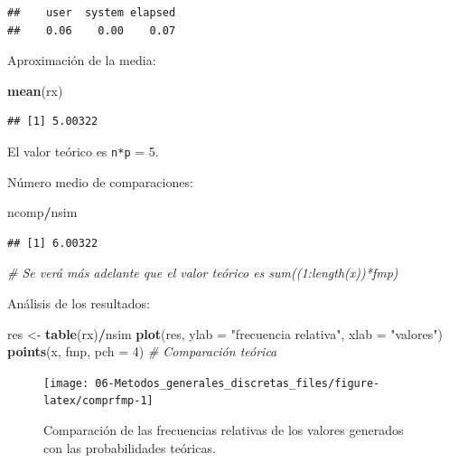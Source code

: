 \documentclass[
]{book}
\newenvironment{Shaded}{\begin{snugshade}}{\end{snugshade}}
\newcommand{\CommentTok}[1]{\textcolor[rgb]{0.56,0.35,0.01}{\textit{#1}}}
\newcommand{\DataTypeTok}[1]{\textcolor[rgb]{0.13,0.29,0.53}{#1}}
\newcommand{\DecValTok}[1]{\textcolor[rgb]{0.00,0.00,0.81}{#1}}
\newcommand{\KeywordTok}[1]{\textcolor[rgb]{0.13,0.29,0.53}{\textbf{#1}}}
\newcommand{\NormalTok}[1]{#1}
\newcommand{\OperatorTok}[1]{\textcolor[rgb]{0.81,0.36,0.00}{\textbf{#1}}}
\newcommand{\StringTok}[1]{\textcolor[rgb]{0.31,0.60,0.02}{#1}}
\theoremstyle{break}
\theoremstyle{definition}
\theoremstyle{definition}
\theoremstyle{definition}
\theoremstyle{remark}
\begin{document}
\begin{verbatim}
##    user  system elapsed 
##    0.06    0.00    0.07
\end{verbatim}

Aproximación de la media:

\begin{Shaded}
\begin{Highlighting}[]
\KeywordTok{mean}\NormalTok{(rx)}
\end{Highlighting}
\end{Shaded}

\begin{verbatim}
## [1] 5.00322
\end{verbatim}

El valor teórico es \texttt{n*p} = 5.

Número medio de comparaciones:

\begin{Shaded}
\begin{Highlighting}[]
\NormalTok{ncomp}\OperatorTok{/}\NormalTok{nsim}
\end{Highlighting}
\end{Shaded}

\begin{verbatim}
## [1] 6.00322
\end{verbatim}

\begin{Shaded}
\begin{Highlighting}[]
\CommentTok{# Se verá más adelante que el valor teórico es sum((1:length(x))*fmp)}
\end{Highlighting}
\end{Shaded}

Análisis de los resultados:

\begin{Shaded}
\begin{Highlighting}[]
\NormalTok{res <-}\StringTok{ }\KeywordTok{table}\NormalTok{(rx)}\OperatorTok{/}\NormalTok{nsim}
\KeywordTok{plot}\NormalTok{(res, }\DataTypeTok{ylab =} \StringTok{"frecuencia relativa"}\NormalTok{, }\DataTypeTok{xlab =} \StringTok{"valores"}\NormalTok{)}
\KeywordTok{points}\NormalTok{(x, fmp, }\DataTypeTok{pch =} \DecValTok{4}\NormalTok{)  }\CommentTok{# Comparación teórica}
\end{Highlighting}
\end{Shaded}

\begin{figure}[!htb]

{\centering \texttt{[image: 06-Metodos\_generales\_discretas\_files/figure-latex/comprfmp-1]} 

}

\caption{Comparación de las frecuencias relativas de los valores generados con las probabilidades teóricas.}\label{fig:comprfmp}
\end{figure}
\end{document}
